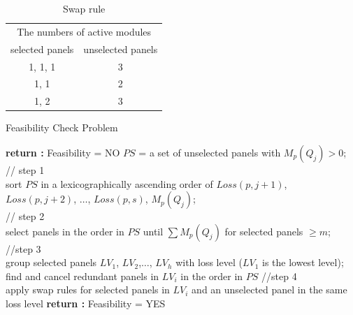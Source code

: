 \documentclass[conference]{pvsctran}
\begin{document}
\begin{table}[ht]
\caption{Swap rule}
\label{tab:swap}
\centering
\begin{tabular}{c|c}
\hline\hline
\multicolumn{2}{c}{The numbers of active modules} \\
selected panels & unselected panels \\ \hline
1, 1, 1 & 3 \\ \hline
1, 1 & 2 \\ \hline
1, 2 & 3 \\ \hline
\end{tabular}
\end{table}

\begin{algorithm}
\caption{Feasibility Check Problem}
\LinesNumbered
{}  
    {{
       {\textup{\textbf{return :}} Feasibility = NO}}
     $PS$ = a set of unselected panels with $M_{p}(Q_{j}) > 0$;\\
     // step 1\\
     sort $PS$ in a lexicographically ascending order of $Loss(p,j+1)$, $Loss(p,j+2)$, $\ldots$, $Loss(p,s)$, $M_{p}(Q_{j})$;\\
     // step 2\\
     select panels in the order in $PS$ until $\sum M_{p}(Q_{j})$ for selected panels $\geq m$;\\
     //step 3\\
     group selected panels $LV_{1}$, $LV_{2}$,$\ldots$, $LV_{h}$ with loss level ($LV_{1}$ is the lowest level);\\
     {find and cancel redundant panels in $LV_{i}$ in the order in $PS$}
     //step 4\\
     {apply swap rules for selected panels in $LV_{i}$ and an unselected panel in the same loss level}
    }
    \textup{\textbf{return :}} Feasibility = YES
\end{algorithm}
\end{document}
